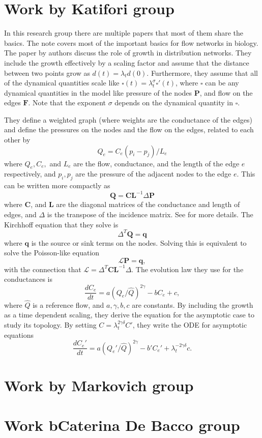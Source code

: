 \documentclass[10pt,a4paper,twocolumn]{article}
\begin{document}
	\section{Work by Katifori group}
	In this research group there are multiple papers that most of them share the basics. The note \cite{KatiforiJune2019} covers most of the important basics for flow networks in biology. The paper by \cite{Ronellenfitsch2016} authors discuss the role of growth in distribution networks. They include the growth effectively by a scaling factor and assume that the distance between two points grow as $ d(t) = \lambda_t d(0) $. Furthermore, they assume that all of the dynamical quantities scale like $ \square(t) = \lambda_t^\sigma \square'(t) $, where $ \square $ can be any dynamical quantities in the model like pressure of the nodes $ \mathbf{P} $, and flow on the edges $ \mathbf{F} $. Note that the exponent $ \sigma $ depends on the dynamical quantity in $ \square $.
	
	They define a weighted graph (where weights are the conductance of the edges) and define the pressures on the nodes and the flow on the edges, related to each other by
	\[ Q_e = C_e (p_i - p_j)/L_e \]
	where $ Q_e, C_e, $ and $ L_e $ are the flow, conductance, and the length of the edge $ e $ respectively, and $ p_i, p_j $ are the pressure of the adjacent nodes to the edge $ e $. This can be written more compactly as
	\[ \mathbf{Q} = \mathbf{C}\mathbf{L}^{-1}\Delta \mathbf{P} \]
	where $ \mathbf{C} $, and $ \mathbf{L} $ are the diagonal matrices of the conductance and length of edges, and $ \Delta $ is the transpose of the incidence matrix. See \cite{FeleParanj2024} for more details. The Kirchhoff equation that they solve is 
	\[ \Delta^T \mathbf{Q} = \mathbf{q}  \]
	where $ \mathbf{q} $ is the source or sink terms on the nodes. Solving this is equivalent to solve the Poisson-like equation
	\[ \mathcal{L} \mathbf{P} = \mathbf{q}, \]
	with the connection that $ \mathcal{L} = \Delta ^T  \mathbf{C}\mathbf{L}^{-1} \Delta  $. The evolution law they use for the conductances is
	\[ \frac{d C_e}{dt} = a (Q_e/\hat{Q})^{2\gamma} - b C_e + c, \]
	where $ \hat{Q} $ is a reference flow, and $ a,\gamma, b, c $ are constants. By including the growth as a time dependent scaling, they derive the equation for the asymptotic case to study its topology. By setting $ C = \lambda_t^{2\gamma\delta} C' $, they write the ODE for asymptotic equations
	\[ \frac{d C_e'}{dt} = a(Q_e'/\hat{Q})^{2\gamma} - b' C_e' + \lambda_t^{-2\gamma\delta}c. \]
	 
	
	\section{Work by Markovich group}
	
	
	\section{Work bCaterina De Bacco group}
	
	\newpage
	
\end{document}
